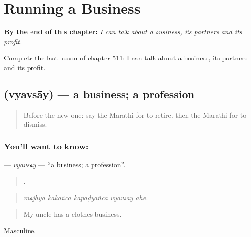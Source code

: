 
\chapter{Running a Business}
\label{ch:mr-running-a-business}

\begin{chapteropening}
\textbf{By the end of this chapter:} \emph{I can talk about a business, its partners and its profit.}

Complete the last lesson of chapter 511: I can talk about a business, its partners and its profit.
\end{chapteropening}

\section[\texorpdfstring{\mr{व्यवसाय} (vyavsāy)}{व्यवसाय (vyavsāy)}]{ (vyavsāy) — a business; a profession}

\label{lesson:MR-C511-vyavsay}



\begin{quote}
Before the new one: say the Marathi for to retire, then the Marathi for to dismiss.
\end{quote}

\subsection*{You'll want to know: }
\textbf{} — \emph{vyavsāy} — \textquotedblleft{}a business; a profession\textquotedblright{}.

\begin{quote}
    .
\end{quote}

\begin{quote}
\emph{mājhyā kākāñcā kapaḍyāñcā vyavsāy āhe.}
\end{quote}

\begin{quote}
My uncle has a clothes business.
\end{quote}

Masculine.

